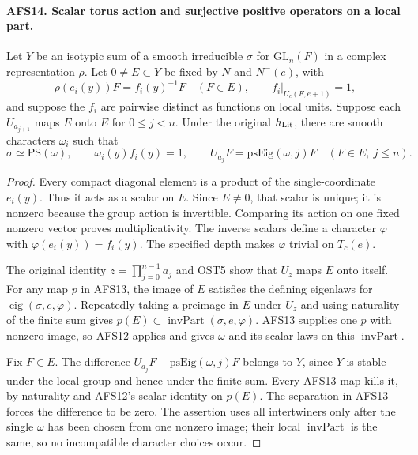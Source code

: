 \paragraph{AFS14. Scalar torus action and surjective positive operators on a local part.}
\label{claim:AFS14}
Let $Y$ be an isotypic sum of a smooth irreducible
$\sigma$ for $\mathrm{GL}_n(F)$ in a complex representation
$\rho$.  Let $0\ne E\subset Y$ be fixed by $N$ and
$N^-(e)$, with
\[
 \rho(e_i(y))F=f_i(y)^{-1}F\quad(F\in E),
 \qquad f_i|_{U_c(F,e+1)}=1,
\]
and suppose the $f_i$ are pairwise distinct as functions
on local units.  Suppose each $U_{a_{j+1}}$ maps $E$ onto
$E$ for $0\leq j<n$.  Under the original $h_{\rm Lit}$,
there are smooth characters $\omega_i$ such that
\[
 \sigma\simeq\mathrm{PS}(\omega),\qquad
 \omega_i(y)f_i(y)=1,
 \qquad U_{a_j}F=\mathrm{psEig}(\omega,j)F
                         \quad(F\in E,\ j\leq n).
\]
\begin{proof}
Every compact diagonal element is a product of the
single-coordinate $e_i(y)$.  Thus it acts as a scalar on
$E$.  Since $E\ne0$, that scalar is unique; it is nonzero
because the group action is invertible.  Comparing its
action on one fixed nonzero vector proves multiplicativity.
The inverse scalars define a character $\varphi$ with
$\varphi(e_i(y))=f_i(y)$.  The specified depth makes
$\varphi$ trivial on $T_c(e)$.

The original identity $z=\prod_{j=0}^{n-1}a_j$ and OST5
show that $U_z$ maps $E$ onto itself.  For any map $p$ in
AFS13, the image of $E$ satisfies the defining eigenlaws
for $\operatorname{eig}(\sigma,e,\varphi)$.  Repeatedly
taking a preimage in $E$ under $U_z$ and using naturality
of the finite sum gives
$p(E)\subset\operatorname{invPart}(\sigma,e,\varphi)$.
AFS13 supplies one $p$ with nonzero image, so AFS12 applies
and gives $\omega$ and its scalar laws on this
$\operatorname{invPart}$.

Fix $F\in E$.  The difference
$U_{a_j}F-\mathrm{psEig}(\omega,j)F$ belongs to $Y$,
since $Y$ is stable under the local group and hence under
the finite sum.  Every AFS13 map kills it, by naturality
and AFS12's scalar identity on $p(E)$.  The separation
in AFS13 forces the difference to be zero.  The assertion
uses all intertwiners only after the single $\omega$ has
been chosen from one nonzero image; their local
$\operatorname{invPart}$ is the same, so no incompatible
character choices occur.
\end{proof}

